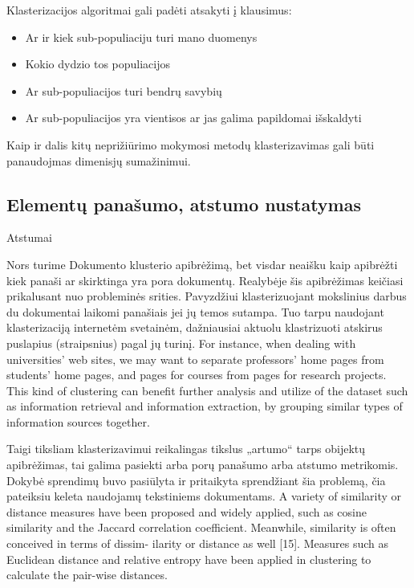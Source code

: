 \documentclass{VUMIFInfKursinis}
\begin{document}
	Klasterizacijos algoritmai gali padėti atsakyti į klausimus:
	\begin{itemize}
		\item Ar ir kiek sub-populiaciju turi mano duomenys
		\item Kokio dydzio tos populiacijos
		\item Ar sub-populiacijos turi bendrų savybių
		\item Ar sub-populiacijos yra vientisos ar jas galima papildomai išskaldyti
	\end{itemize}
	Kaip ir dalis kitų neprižiūrimo mokymosi metodų klasterizavimas gali būti panaudojmas dimenisjų sumažinimui. 


	\subsection{Elementų panašumo, atstumo nustatymas}
		 Atstumai

		Nors turime Dokumento klusterio apibrėžimą, bet visdar neaišku kaip apibrėžti kiek panaši ar skirktinga yra pora dokumentų. Realybėje šis apibrėžimas keičiasi prikalusant nuo probleminės srities. Pavyzdžiui klasterizuojant mokslinius darbus du dokumentai laikomi panašiais jei jų temos sutampa. Tuo tarpu naudojant klasterizaciją internetėm svetainėm, dažniausiai aktuolu klastrizuoti atskirus puslapius (straipsnius) pagal jų turinį.
		For instance, when dealing with universities’ web sites, we may want to separate professors’ home pages from students’ home pages, and pages for courses from pages for research projects. This kind of clustering can benefit further analysis and utilize of the dataset such as information retrieval and information extraction, by grouping similar types of information sources together.

		Taigi tiksliam klasterizavimui reikalingas tikslus „artumo“ tarps obijektų apibrėžimas, tai galima pasiekti arba porų panašumo arba atstumo metrikomis. Dokybė sprendimų buvo pasiūlyta ir pritaikyta sprendžiant šia problemą, čia pateiksiu keleta naudojamų tekstiniems dokumentams.
		A variety of similarity or distance measures have been proposed and widely applied, such as cosine similarity and the Jaccard correlation coefficient.  Meanwhile, similarity is often conceived in terms of dissim- ilarity or distance as well [15]. Measures such as Euclidean distance and relative entropy have been applied in clustering to calculate the pair-wise distances.
\end{document}
